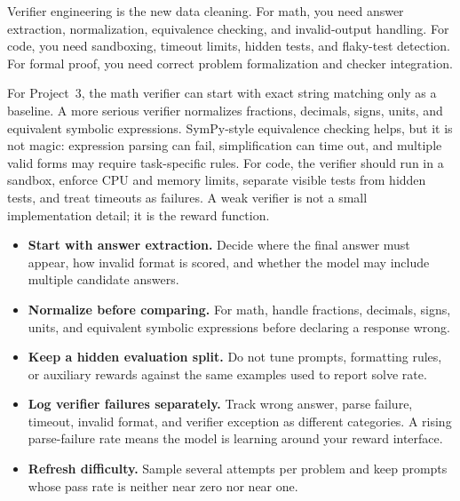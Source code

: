 Verifier engineering is the new data cleaning. For math, you need answer extraction, normalization, equivalence checking, and invalid-output handling. For code, you need sandboxing, timeout limits, hidden tests, and flaky-test detection. For formal proof, you need correct problem formalization and checker integration.

For Project~3, the math verifier can start with exact string matching only as a baseline. A more serious verifier normalizes fractions, decimals, signs, units, and equivalent symbolic expressions. SymPy-style equivalence checking helps, but it is not magic: expression parsing can fail, simplification can time out, and multiple valid forms may require task-specific rules. For code, the verifier should run in a sandbox, enforce CPU and memory limits, separate visible tests from hidden tests, and treat timeouts as failures. A weak verifier is not a small implementation detail; it is the reward function.

\begin{tcolorbox}[colback=orange!5, colframe=orange!60, title=\textbf{For Project~3: Building the Verifier}]
\begin{itemize}[nosep]
  \item \textbf{Start with answer extraction.} Decide where the final answer must appear, how invalid format is scored, and whether the model may include multiple candidate answers.
  \item \textbf{Normalize before comparing.} For math, handle fractions, decimals, signs, units, and equivalent symbolic expressions before declaring a response wrong.
  \item \textbf{Keep a hidden evaluation split.} Do not tune prompts, formatting rules, or auxiliary rewards against the same examples used to report solve rate.
  \item \textbf{Log verifier failures separately.} Track wrong answer, parse failure, timeout, invalid format, and verifier exception as different categories. A rising parse-failure rate means the model is learning around your reward interface.
  \item \textbf{Refresh difficulty.} Sample several attempts per problem and keep prompts whose pass rate is neither near zero nor near one.
\end{itemize}
\end{tcolorbox}

\noindent{}

